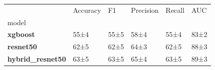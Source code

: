 \begin{tabular}{llllll}
\toprule
 & Accuracy & F1 & Precision & Recall & AUC \\
model &  &  &  &  &  \\
\midrule
\textbf{xgboost} & 55±4 & 55±5 & 58±4 & 55±4 & 83±2 \\
\textbf{resnet50} & 62±5 & 62±5 & 64±3 & 62±5 & 88±3 \\
\textbf{hybrid_resnet50} & 63±5 & 63±5 & 65±4 & 63±5 & 89±3 \\
\bottomrule
\end{tabular}
